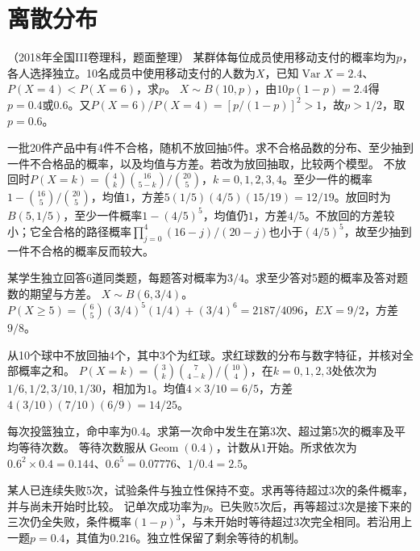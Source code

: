 \par\addvspace{12pt}

\section{离散分布}

（2018年全国III卷理科，题面整理）
某群体每位成员使用移动支付的概率均为\(p\)，各人选择独立。10名成员中使用移动支付的人数为\(X\)，已知\(\operatorname{Var}X=2.4\)、\(P(X=4)<P(X=6)\)，求\(p\)。
\solutionanswer
\(X\sim B(10,p)\)，由\(10p(1-p)=2.4\)得\(p=0.4\)或\(0.6\)。又\(P(X=6)/P(X=4)=[p/(1-p)]^2>1\)，故\(p>1/2\)，取\(p=0.6\)。


一批20件产品中有4件不合格，随机不放回抽5件。求不合格品数的分布、至少抽到一件不合格品的概率，以及均值与方差。若改为放回抽取，比较两个模型。
\solutionanswer
不放回时\(P(X=k)=\binom4k\binom{16}{5-k}/\binom{20}5\)，\(k=0,1,2,3,4\)。至少一件的概率\(1-\binom{16}5/\binom{20}5\)，均值\(1\)，方差\(5(1/5)(4/5)(15/19)=12/19\)。放回时为\(B(5,1/5)\)，至少一件概率\(1-(4/5)^5\)，均值仍\(1\)，方差\(4/5\)。不放回的方差较小；它全合格的路径概率\(\prod_{j=0}^4(16-j)/(20-j)\)也小于\((4/5)^5\)，故至少抽到一件不合格的概率反而较大。


某学生独立回答6道同类题，每题答对概率为\(3/4\)。求至少答对5题的概率及答对题数的期望与方差。
\solutionanswer
\(X\sim B(6,3/4)\)。\(P(X\ge5)=\binom65(3/4)^5(1/4)+(3/4)^6=2187/4096\)，\(EX=9/2\)，方差\(9/8\)。


从10个球中不放回抽4个，其中3个为红球。求红球数的分布与数字特征，并核对全部概率之和。
\solutionanswer
\(P(X=k)=\binom3k\binom7{4-k}/\binom{10}4\)，在\(k=0,1,2,3\)处依次为\(1/6,1/2,3/10,1/30\)，相加为\(1\)。均值\(4\times3/10=6/5\)，方差\(4(3/10)(7/10)(6/9)=14/25\)。


每次投篮独立，命中率为\(0.4\)。求第一次命中发生在第3次、超过第5次的概率及平均等待次数。
\solutionanswer
等待次数服从\(\operatorname{Geom}(0.4)\)，计数从\(1\)开始。所求依次为\(0.6^2\times0.4=0.144\)、\(0.6^5=0.07776\)、\(1/0.4=2.5\)。


某人已连续失败5次，试验条件与独立性保持不变。求再等待超过3次的条件概率，并与尚未开始时比较。
\solutionanswer
记单次成功率为\(p\)。已失败5次后，再等超过3次是接下来的三次仍全失败，条件概率\((1-p)^3\)，与未开始时等待超过3次完全相同。若沿用上一题\(p=0.4\)，其值为\(0.216\)。独立性保留了剩余等待的机制。


